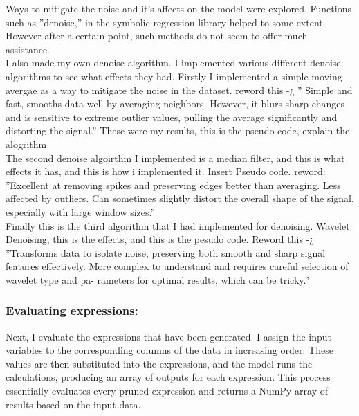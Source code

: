 \documentclass{article}
\begin{document}
Ways to mitigate the noise and it’s affects on the model were explored. Functions such as ”denoise,” in the
symbolic regression library helped to some extent. However after a certain point, such methods do not seem to
offer much assistance.\\
I also made my own denoise algorithm. I implemented various different denoise algorithms to see what effects
they had. Firstly I implemented a simple moving avergae as a way to mitigate the noise in the dataset. reword
this -¿ ” Simple and fast, smooths data well by averaging neighbors. However, it blurs sharp changes and is
sensitive to extreme outlier values, pulling the average significantly and distorting the signal.”
These were my results, this is the pseudo code, explain the alogrithm\\

The second denoise algoirthm I implemented is a median filter, and this is what effects it has, and this is how
i implemented it. Insert Pseudo code. reword: ”Excellent at removing spikes and preserving edges better than
averaging. Less affected by outliers. Can sometimes slightly distort the overall shape of the signal, especially
with large window sizes.”\\

Finally this is the third algorithm that I had implemented for denoising. Wavelet Denoising, this is the effects,
and this is the pesudo code. Reword this -¿ ”Transforms data to isolate noise, preserving both smooth and sharp
signal features effectively. More complex to understand and requires careful selection of wavelet type and pa-
rameters for optimal results, which can be tricky.”\\





\subsubsection{Evaluating expressions:}


Next, I evaluate the expressions that have been generated. I assign the input variables to the corresponding columns of the data in increasing order. These values are then substituted into the expressions, and the model runs the calculations, producing an array of outputs for each expression. This process essentially evaluates every pruned expression and returns a NumPy array of results based on the input data.\\
\end{document}
